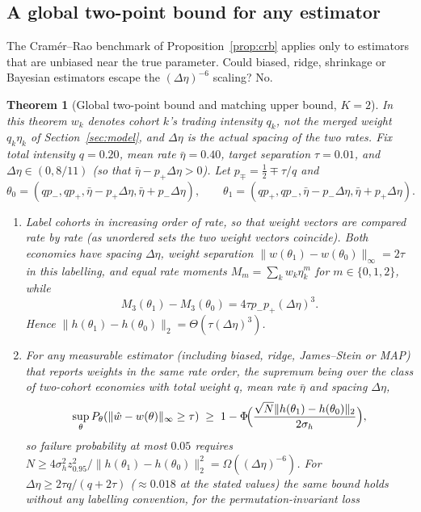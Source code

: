\documentclass[12pt]{article}
\newtheorem{theorem}{Theorem}[section]
\theoremstyle{definition}
\theoremstyle{remark}
\begin{document}
\subsection{A global two-point bound for any estimator}

The Cram\'er--Rao benchmark of Proposition~\ref{prop:crb} applies only to estimators that are unbiased near the true parameter. Could biased, ridge, shrinkage or Bayesian estimators escape the $(\Delta\eta)^{-6}$ scaling? No.

\begin{theorem}[Global two-point bound and matching upper bound, $K=2$]\label{thm:twocohort}
In this theorem $w_k$ denotes cohort $k$'s trading intensity $q_k$, not the merged weight $q_k\eta_k$ of Section~\ref{sec:model}, and $\Delta\eta$ is the actual spacing of the two rates. Fix total intensity $q=0.20$, mean rate $\bar\eta=0.40$, target separation $\tau=0.01$, and $\Delta\eta\in(0,8/11)$ (so that $\bar\eta-p_+\Delta\eta>0$). Let $p_\mp=\tfrac12\mp\tau/q$ and
\begin{equation}\label{eq:pair}
\theta_0=(qp_-,qp_+,\bar\eta-p_+\Delta\eta,\bar\eta+p_-\Delta\eta),\qquad\theta_1=(qp_+,qp_-,\bar\eta-p_-\Delta\eta,\bar\eta+p_+\Delta\eta).
\end{equation}
\begin{enumerate}[label=(\roman*)]
\item Label cohorts in increasing order of rate, so that weight vectors are compared rate by rate (as unordered sets the two weight vectors coincide). Both economies have spacing $\Delta\eta$, weight separation $\|w(\theta_1)-w(\theta_0)\|_\infty=2\tau$ in this labelling, and equal rate moments $M_m=\sum_kw_k\eta_k^m$ for $m\in\{0,1,2\}$, while
\begin{equation}\label{eq:dM3}
M_3(\theta_1)-M_3(\theta_0)=4\tau p_-p_+(\Delta\eta)^3 .
\end{equation}
Hence $\|h(\theta_1)-h(\theta_0)\|_2=\Theta(\tau(\Delta\eta)^3)$.
\item For any measurable estimator (including biased, ridge, James--Stein or MAP) that reports weights in the same rate order, the supremum being over the class of two-cohort economies with total weight $q$, mean rate $\bar\eta$ and spacing $\Delta\eta$,
\begin{equation}\label{eq:lecam2}
\sup_\theta P_\theta(\|\hat w-w(\theta)\|_\infty\ge\tau)\;\ge\;1-\Phi\!\Bigl(\frac{\sqrt N\|h(\theta_1)-h(\theta_0)\|_2}{2\sigma_h}\Bigr),
\end{equation}
so failure probability at most $0.05$ requires $N\ge4\sigma_h^2z_{0.95}^2/\|h(\theta_1)-h(\theta_0)\|_2^2=\Omega((\Delta\eta)^{-6})$. For $\Delta\eta\ge2\tau q/(q+2\tau)$ ($\approx0.018$ at the stated values) the same bound holds without any labelling convention, for the permutation-invariant loss

\end{enumerate}
\end{theorem}
\end{document}

